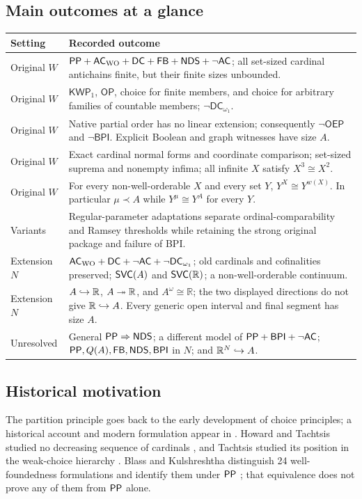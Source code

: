 \subsection{Main outcomes at a glance}
\begin{longtable}{>{\raggedright\arraybackslash}p{.20\linewidth}>{\raggedright\arraybackslash}p{.72\linewidth}}
\toprule
Setting & Recorded outcome\\\midrule\endhead
Original $W$ & $\mathsf{PP}+\mathsf{AC}_{\mathrm{WO}}+\mathsf{DC}+\mathsf{FB}+\mathsf{NDS}+\neg\mathsf{AC}$; all set-sized cardinal antichains finite, but their finite sizes unbounded.\\
Original $W$ & $\mathsf{KWP}_1$, $\mathsf{OP}$, choice for finite members, and choice for arbitrary families of countable members; $\neg\mathsf{DC}_{\omega_1}$.\\
Original $W$ & Native partial order has no linear extension; consequently $\neg\mathsf{OEP}$ and $\neg\mathsf{BPI}$. Explicit Boolean and graph witnesses have size $A$.\\
Original $W$ & Exact cardinal normal forms and coordinate comparison; set-sized suprema and nonempty infima; all infinite $X$ satisfy $X^3\cong X^2$.\\
Original $W$ & For every non-well-orderable $X$ and every set $Y$, $Y^X\cong Y^{w(X)}$. In particular $\mu\prec A$ while $Y^\mu\cong Y^A$ for every $Y$.\\
Variants & Regular-parameter adaptations separate ordinal-comparability and Ramsey thresholds while retaining the strong original package and failure of BPI.\\
Extension $N$ & $\mathsf{AC}_{\mathrm{WO}}+\mathsf{DC}+\neg\mathsf{AC}+\neg\mathsf{DC}_{\omega_1}$; old cardinals and cofinalities preserved; $\mathsf{SVC}(A)$ and $\mathsf{SVC}(\mathbb R)$; a non-well-orderable continuum.\\
Extension $N$ & $A\hookrightarrow\mathbb R$, $A\twoheadrightarrow\mathbb R$, and $A^\omega\cong\mathbb R$; the two displayed directions do not give $\mathbb R\hookrightarrow A$. Every generic open interval and final segment has size $A$.\\
Unresolved & General $\mathsf{PP}\Rightarrow\mathsf{NDS}$; a different model of $\mathsf{PP}+\mathsf{BPI}+\neg\mathsf{AC}$; $\mathsf{PP},Q(A),\mathsf{FB},\mathsf{NDS},\mathsf{BPI}$ in $N$; and $\mathbb R^N\hookrightarrow A$.\\
\bottomrule
\end{longtable}

\subsection{Historical motivation}
The partition principle goes back to the early development of choice principles; a historical account and modern formulation appear in \cite{daSilva,BM}. Howard and Tachtsis studied no decreasing sequence of cardinals \cite{HT}, and Tachtsis studied its position in the weak-choice hierarchy \cite{Tachtsis2024}. Blass and Kulshreshtha distinguish 24 well-foundedness formulations and identify them under $\mathsf{PP}$ \cite{BK}; that equivalence does not prove any of them from $\mathsf{PP}$ alone.

